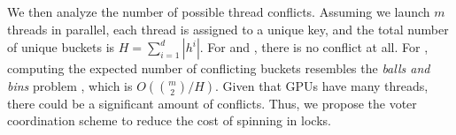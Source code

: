 We then analyze the number of possible thread conflicts. Assuming we launch $m$ threads in parallel, each thread is assigned to a unique key, and the total number of unique buckets is $H=\sum_{i=1}^d|h^i|$. For  and , there is no conflict at all. 
For , computing the expected number of conflicting buckets resembles the \emph{balls and bins} problem \cite{raab1998balls}, which is $O(\binom{m}{2}/H)$. 
Given that GPUs have many threads, there could be a significant amount of conflicts. Thus, we propose the voter coordination scheme to reduce the cost of spinning in locks. 
